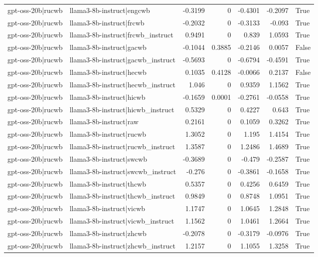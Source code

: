 \begin{table}
\begin{tabular}{l l r r r r l}
gpt-oss-20b|rucwb & llama3-8b-instruct|engcwb & -0.3199 & 0 & -0.4301 & -0.2097 & True \\
gpt-oss-20b|rucwb & llama3-8b-instruct|frcwb & -0.2032 & 0 & -0.3133 & -0.093 & True \\
gpt-oss-20b|rucwb & llama3-8b-instruct|frcwb_instruct & 0.9491 & 0 & 0.839 & 1.0593 & True \\
gpt-oss-20b|rucwb & llama3-8b-instruct|gacwb & -0.1044 & 0.3885 & -0.2146 & 0.0057 & False \\
gpt-oss-20b|rucwb & llama3-8b-instruct|gacwb_instruct & -0.5693 & 0 & -0.6794 & -0.4591 & True \\
gpt-oss-20b|rucwb & llama3-8b-instruct|hecwb & 0.1035 & 0.4128 & -0.0066 & 0.2137 & False \\
gpt-oss-20b|rucwb & llama3-8b-instruct|hecwb_instruct & 1.046 & 0 & 0.9359 & 1.1562 & True \\
gpt-oss-20b|rucwb & llama3-8b-instruct|hicwb & -0.1659 & 0.0001 & -0.2761 & -0.0558 & True \\
gpt-oss-20b|rucwb & llama3-8b-instruct|hicwb_instruct & 0.5329 & 0 & 0.4227 & 0.643 & True \\
gpt-oss-20b|rucwb & llama3-8b-instruct|raw & 0.2161 & 0 & 0.1059 & 0.3262 & True \\
gpt-oss-20b|rucwb & llama3-8b-instruct|rucwb & 1.3052 & 0 & 1.195 & 1.4154 & True \\
gpt-oss-20b|rucwb & llama3-8b-instruct|rucwb_instruct & 1.3587 & 0 & 1.2486 & 1.4689 & True \\
gpt-oss-20b|rucwb & llama3-8b-instruct|swcwb & -0.3689 & 0 & -0.479 & -0.2587 & True \\
gpt-oss-20b|rucwb & llama3-8b-instruct|swcwb_instruct & -0.276 & 0 & -0.3861 & -0.1658 & True \\
gpt-oss-20b|rucwb & llama3-8b-instruct|thcwb & 0.5357 & 0 & 0.4256 & 0.6459 & True \\
gpt-oss-20b|rucwb & llama3-8b-instruct|thcwb_instruct & 0.9849 & 0 & 0.8748 & 1.0951 & True \\
gpt-oss-20b|rucwb & llama3-8b-instruct|vicwb & 1.1747 & 0 & 1.0645 & 1.2848 & True \\
gpt-oss-20b|rucwb & llama3-8b-instruct|vicwb_instruct & 1.1562 & 0 & 1.0461 & 1.2664 & True \\
gpt-oss-20b|rucwb & llama3-8b-instruct|zhcwb & -0.2078 & 0 & -0.3179 & -0.0976 & True \\
gpt-oss-20b|rucwb & llama3-8b-instruct|zhcwb_instruct & 1.2157 & 0 & 1.1055 & 1.3258 & True \\

\end{tabular}
\end{table}
